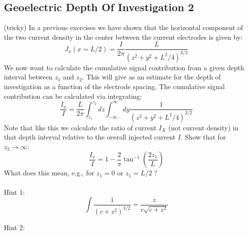 \subsection{Geoelectric Depth Of Investigation 2}
(tricky) In a previous exercises we have shown that the horizontal component of the two current density in the center between the current electrodes is given by:
$$
 J_x(x=L/2) = \frac{I}{2\pi}\frac{L}{(z^2+y^2+L^2/4)^{3/2}}
$$
We now want to calculate the cumulative signal contribution from a given depth interval between $z_1$ and $z_2$. This will give as an estimate for the depth of investigation as a function of the electrode spacing. The cumulative signal contribution can be calculated via integrating:
$$
    \frac{I_x}{I} = \frac{L}{2\pi}\int_{z_1}^{z_2}dz \int_{-\infty}^{\infty}dy\frac{1}{(z^2+y^2+L^2/4)^{3/2}}
$$
Note that like this we calculate the ratio of current $I_X$ (not current density) in that depth interval relative to the overall injected current $I$. Show that for $z_2\rightarrow \infty$:
$$
\frac{I_x}{I} = 1 - \frac{2}{\pi}\tan^{-1}(\frac{2z_1}{L})
$$
What does this mean, e.g., for $z_1=0$ or $z_1 = L/2$ ? \\
\\
Hint 1: 
$$\int \frac{1}{(c+z^2)^{3/2}} = \frac{z}{c\sqrt{c+z^2}}$$


Hint 2: 

